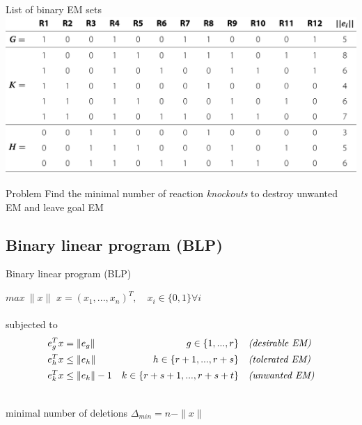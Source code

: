 \documentclass{beamer}
\begin{document}

\begin{frame}{List of binary EM sets}
    \includegraphics[width=\textwidth]{grafik/table1b}
\pause    
    \begin{block}{Problem}
        Find the minimal number of reaction \emph{knockouts} to destroy unwanted EM
        and leave goal EM
    \end{block}
\end{frame}

\subsection{Binary linear program (BLP)}


\begin{frame}{Binary linear program (BLP)}
    
$max ~\|x\|$ \hfill $x = (x_{1}, ..., x_{n})^{T}, \quad x_{i} \in \{0, 1\} \forall i$ \\
~\\
\pause
subjected to  
\begin{align*}
    e^{T}_{g} x & =       \|e_{g}\|      & g \in \{1, ..., r\}     
    & \quad\text{\emph{(desirable EM)}}\\
    e^{T}_{h} x & \leq    \|e_{h}\|     & h \in \{r+1, ..., r+s\} 
    & \quad\text{\emph{(tolerated EM)}}\\
    e^{T}_{k} x & \leq    \|e_{k}\|-1  & k \in \{r+s+1, ..., r+s+t\}
    & \quad\text{\emph{(unwanted EM)}}\\
\end{align*}

\pause
~\\
minimal number of deletions $\Delta_{min} = n - \|x\|$

\end{frame}
\end{document}
